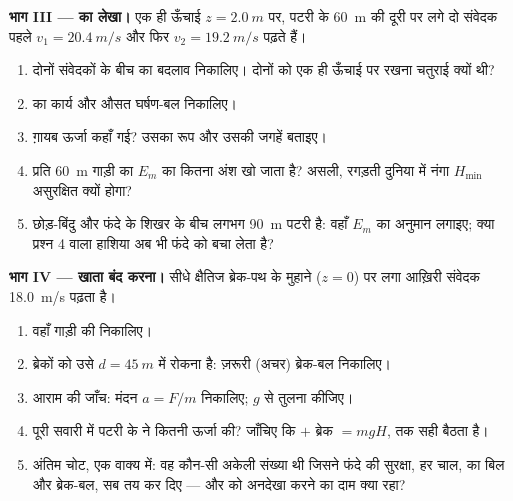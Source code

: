 \begin{problem}
\medskip
\noindent\textbf{भाग III ---  का लेखा।}
एक ही ऊँचाई $z = \qty{2.0}{m}$ पर, पटरी के \qty{60}{m} की दूरी पर लगे दो संवेदक पहले
$v_1 = \qty{20.4}{m/s}$ और फिर $v_2 = \qty{19.2}{m/s}$ पढ़ते हैं।
\begin{enumerate}[resume]
  \item दोनों संवेदकों के बीच  का बदलाव निकालिए।
        दोनों को एक ही ऊँचाई पर रखना चतुराई क्यों थी?
  \item {} का कार्य और औसत घर्षण-बल
        निकालिए।
  \item ग़ायब ऊर्जा कहाँ गई? उसका रूप और उसकी जगहें बताइए।
  \item प्रति \qty{60}{m} गाड़ी का $E_m$ का कितना अंश खो जाता है? असली, रगड़ती
        दुनिया में नंगा $H_{\min}$ असुरक्षित क्यों होगा?
  \item छोड़-बिंदु और फंदे के शिखर के बीच लगभग \qty{90}{m} पटरी है: वहाँ $E_m$
        का अनुमान लगाइए; क्या प्रश्न 4 वाला हाशिया अब भी फंदे को बचा लेता
        है?
\end{enumerate}

\medskip
\noindent\textbf{भाग IV --- खाता बंद करना।}
सीधे क्षैतिज ब्रेक-पथ के मुहाने ($z = 0$) पर लगा आख़िरी संवेदक \qty{18.0}{m/s} पढ़ता
है।
\begin{enumerate}[resume]
  \item वहाँ गाड़ी की  निकालिए।
  \item ब्रेकों को उसे $d = \qty{45}{m}$ में रोकना है: ज़रूरी (अचर) ब्रेक-बल
        निकालिए।
  \item आराम की जाँच: मंदन $a = F/m$ निकालिए; $g$ से तुलना कीजिए।
  \item पूरी सवारी में पटरी के  ने कितनी ऊर्जा 
        की? जाँचिए कि  $+$ ब्रेक $= mgH$,  तक
        सही बैठता है।
  \item अंतिम चोट, एक वाक्य में: वह कौन-सी अकेली संख्या थी जिसने फंदे की
        सुरक्षा, हर चाल,  का बिल और ब्रेक-बल, सब तय
        कर दिए --- और  को अनदेखा करने का दाम क्या रहा?
\end{enumerate}
\end{problem}
